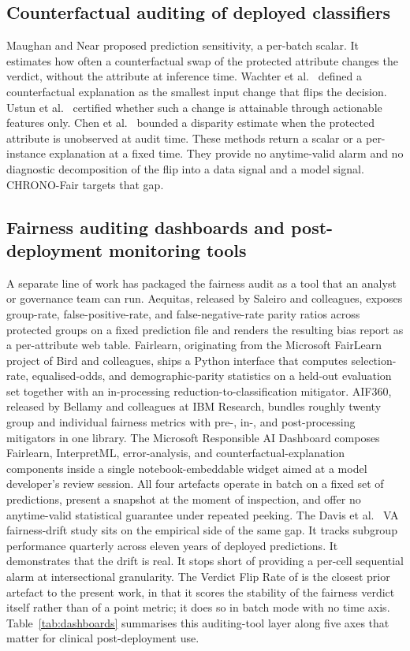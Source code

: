 \documentclass[acmsmall,nonacm,review,anonymous]{acmart}
\newcommand{\1}[1]{\mathbf{1}\!\left\{#1\right\}}
\begin{document}
\subsection{Counterfactual auditing of deployed classifiers}

Maughan and Near \cite{maughan2022} proposed prediction sensitivity, a per-batch scalar. It estimates how often a counterfactual swap of the protected attribute changes the verdict, without the attribute at inference time. Wachter et al.\ \cite{wachter2017} defined a counterfactual explanation as the smallest input change that flips the decision. Ustun et al.\ \cite{ustun2019actionable} certified whether such a change is attainable through actionable features only. Chen et al.\ \cite{chen2019fairness} bounded a disparity estimate when the protected attribute is unobserved at audit time. These methods return a scalar or a per-instance explanation at a fixed time. They provide no anytime-valid alarm and no diagnostic decomposition of the flip into a data signal and a model signal. CHRONO-Fair targets that gap.

\subsection{Fairness auditing dashboards and post-deployment monitoring tools}\label{sec:dashboards}

A separate line of work has packaged the fairness audit as a tool that an analyst or governance team can run. Aequitas, released by Saleiro and colleagues, exposes group-rate, false-positive-rate, and false-negative-rate parity ratios across protected groups on a fixed prediction file and renders the resulting bias report as a per-attribute web table. Fairlearn, originating from the Microsoft FairLearn project of Bird and colleagues, ships a Python interface that computes selection-rate, equalised-odds, and demographic-parity statistics on a held-out evaluation set together with an in-processing reduction-to-classification mitigator. AIF360, released by Bellamy and colleagues at IBM Research, bundles roughly twenty group and individual fairness metrics with pre-, in-, and post-processing mitigators in one library. The Microsoft Responsible AI Dashboard composes Fairlearn, InterpretML, error-analysis, and counterfactual-explanation components inside a single notebook-embeddable widget aimed at a model developer's review session. All four artefacts operate in batch on a fixed set of predictions, present a snapshot at the moment of inspection, and offer no anytime-valid statistical guarantee under repeated peeking. The Davis et al.\ \cite{davis2025} VA fairness-drift study sits on the empirical side of the same gap. It tracks subgroup performance quarterly across eleven years of deployed predictions. It demonstrates that the drift is real. It stops short of providing a per-cell sequential alarm at intersectional granularity. The Verdict Flip Rate of \cite{joy2025vfr} is the closest prior artefact to the present work, in that it scores the stability of the fairness verdict itself rather than of a point metric; it does so in batch mode with no time axis. Table~\ref{tab:dashboards} summarises this auditing-tool layer along five axes that matter for clinical post-deployment use.
\end{document}
